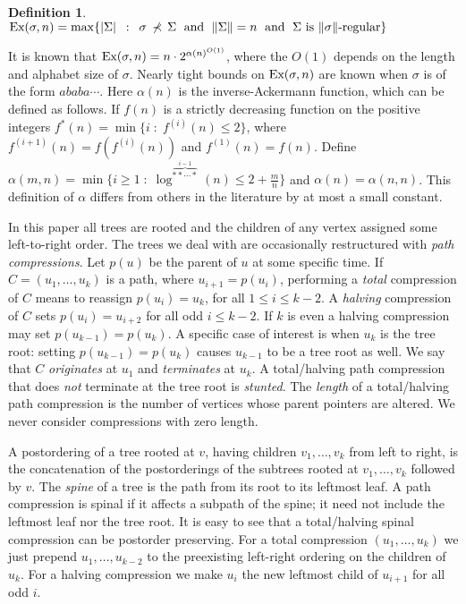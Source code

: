 \documentclass{article}
\newtheorem{definition}[theorem]{Definition}
\newcommand{\Ex}{\mbox{\rm Ex}}
\newcommand{\nsubseq}{\,\nprec\,}
\begin{document}
\begin{definition}
$\Ex(\sigma,n) = \max\{|\Sigma| \;\::\:\; \sigma\nsubseq \Sigma \;\mbox{ and }\; \|\Sigma\| = n \;\mbox{ and }\; \Sigma \mbox{ is $\|\sigma\|$-regular}\}$
\end{definition}

It is known \cite{Klazar92} that $\Ex(\sigma,n) = n\cdot 2^{\alpha(n)^{O(1)}}$, where the $O(1)$ depends on the length
and alphabet size of $\sigma$.  Nearly tight bounds on $\Ex(\sigma,n)$ are known \cite{ASS89} when
$\sigma$ is of the form $ababa\cdots$.
Here $\alpha(n)$ is the inverse-Ackermann function, which can be defined as follows.
If $f(n)$ is a strictly decreasing function on the positive integers 
$f^*(n) = \min\{i \;:\; f^{(i)}(n) \le 2\}$, where $f^{(i+1)}(n) = f(f^{(i)}(n))$ and $f^{(1)}(n) = f(n)$.
Define $\alpha(m,n) = \min\{i\ge 1 \;:\; \log^{\overbrace{**\cdots*}^{i-1}}(n) \le 2+\frac{m}{n}\}$
and $\alpha(n) = \alpha(n,n)$.  This definition of $\alpha$ differs from others in the literature \cite{Tar75,HS86}
by at most a small constant.

In this paper all trees are rooted and the children of any vertex assigned some left-to-right order.
The trees we deal with are occasionally restructured with {\em path compressions}. 
Let $p(u)$ be the parent of $u$ at some specific time.  If $C = (u_1,\ldots,u_k)$ is a path,
where $u_{i+1} = p(u_i)$, performing a {\em total} compression of $C$ means to reassign
$p(u_i) = u_k$, for all $1\le i \le k-2$.  A {\em halving} compression of $C$ sets
$p(u_i) = u_{i+2}$ for all odd $i\le k-2$.  If $k$ is even a halving compression may set
$p(u_{k-1}) = p(u_k)$.  A specific case of interest is when $u_k$ is the tree root:
setting $p(u_{k-1}) = p(u_k)$ causes $u_{k-1}$ to be a tree root as well.
We say that $C$ {\em originates} at $u_1$ and {\em terminates} at $u_k$.
A total/halving path compression that does {\em not} terminate at the tree root is {\em stunted}.
The {\em length} of a total/halving path compression is the number of vertices whose
parent pointers are altered.  We never consider compressions with zero length.

A postordering of a tree rooted at $v$, having
children $v_1,\ldots,v_k$ from left to right, is the concatenation of the postorderings of
the subtrees rooted at $v_1,\ldots,v_k$ followed by $v$.  The {\em spine} of a tree is the path from
its root to its leftmost leaf.  A path compression is spinal if it affects a subpath of the spine; it need
not include the leftmost leaf nor the tree root.  It is easy to see that a total/halving spinal compression
can be postorder preserving.  For a total compression $(u_1,\ldots,u_k)$ we just prepend $u_1,\ldots,u_{k-2}$
to the preexisting left-right ordering on the children of $u_k$.  For a halving compression we make $u_{i}$ the new leftmost child
of $u_{i+1}$ for all odd $i$.
\end{document}

